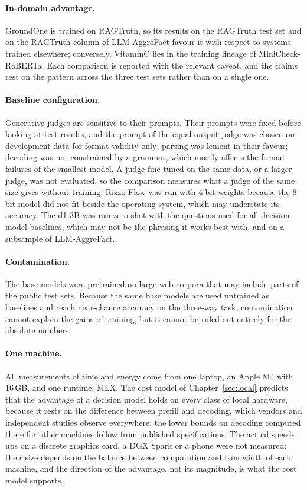 \paragraph{In-domain advantage.} GroundOne is trained on RAGTruth, so its results on the RAGTruth test set and on the
RAGTruth column of LLM-AggreFact favour it with respect to systems trained elsewhere; conversely, VitaminC lies in the
training lineage of MiniCheck-RoBERTa. Each comparison is reported with the relevant caveat, and the claims rest on the
pattern across the three test sets rather than on a single one.

\paragraph{Baseline configuration.} Generative judges are sensitive to their prompts. Their prompts were fixed before
looking at test results, and the prompt of the equal-output judge was chosen on development data for format validity
only; parsing was lenient in their favour; decoding was not constrained by a grammar, which mostly affects the format
failures of the smallest model. A judge fine-tuned on the same data, or a larger judge, was not evaluated, so the
comparison measures what a judge of the same size gives without training. Rizzo-Flow was run with
4-bit weights because the 8-bit model did not fit beside the operating system, which may understate its accuracy. The
d1-3B was run zero-shot with the questions used for all decision-model baselines, which may not
be the phrasing it works best with, and on a subsample of LLM-AggreFact.

\paragraph{Contamination.} The base models were pretrained on large web corpora that may include parts of the public
test sets. Because the same base models are used untrained as baselines and reach near-chance accuracy on the
three-way task, contamination cannot explain the gains of training, but it cannot be ruled out entirely for the absolute
numbers.

\paragraph{One machine.} All measurements of time and energy come from one laptop, an Apple M4 with 16\,GB, and one
runtime, MLX. The cost model of Chapter~\ref{sec:local} predicts that the advantage of a decision model holds on every class
of local hardware, because it rests on the difference between prefill and decoding, which vendors and independent studies
observe everywhere; the lower bounds on decoding computed there for other machines follow from published specifications.
The actual speed-ups on a discrete graphics card, a DGX Spark or a phone were not measured: their size depends on the
balance between computation and bandwidth of each machine, and the direction of the advantage, not its magnitude, is
what the cost model supports.


